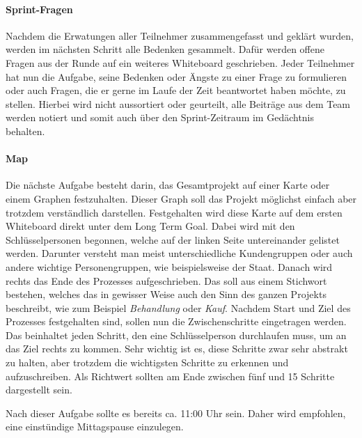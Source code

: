 \paragraph{Sprint-Fragen}
Nachdem die Erwatungen aller Teilnehmer zusammengefasst und geklärt wurden, werden im nächsten Schritt alle Bedenken gesammelt. Dafür werden offene Fragen aus der Runde auf ein weiteres Whiteboard geschrieben. Jeder Teilnehmer hat nun die Aufgabe, seine Bedenken oder Ängste zu einer Frage zu formulieren oder auch Fragen, die er gerne im Laufe der Zeit beantwortet haben möchte, zu stellen. Hierbei wird nicht aussortiert oder geurteilt, alle Beiträge aus dem Team werden notiert und somit auch über den Sprint-Zeitraum im Gedächtnis behalten. 

\paragraph{Map}
Die nächste Aufgabe besteht darin, das Gesamtprojekt auf einer Karte oder einem Graphen festzuhalten. Dieser Graph soll das Projekt möglichst einfach aber trotzdem verständlich darstellen. Festgehalten wird diese Karte auf dem ersten Whiteboard direkt unter dem Long Term Goal. Dabei wird mit den Schlüsselpersonen begonnen, welche auf der linken Seite untereinander gelistet werden. Darunter versteht man meist unterschiedliche Kundengruppen oder auch andere wichtige Personengruppen, wie beispielsweise der Staat. Danach wird rechts das Ende des Prozesses aufgeschrieben. Das soll aus einem Stichwort bestehen, welches das in gewisser Weise auch den Sinn des ganzen Projekts beschreibt, wie zum Beispiel \textit{Behandlung} oder \textit{Kauf}. Nachdem Start und Ziel des Prozesses festgehalten sind, sollen nun die Zwischenschritte eingetragen werden. Das beinhaltet jeden Schritt, den eine Schlüsselperson durchlaufen muss, um an das Ziel rechts zu kommen. Sehr wichtig ist es, diese Schritte zwar sehr abstrakt zu halten, aber trotzdem die wichtigsten Schritte zu erkennen und aufzuschreiben. Als Richtwert sollten am Ende zwischen fünf und 15 Schritte dargestellt sein.

Nach dieser Aufgabe sollte es bereits ca. 11:00 Uhr sein. Daher wird empfohlen, eine einstündige Mittagspause einzulegen.

